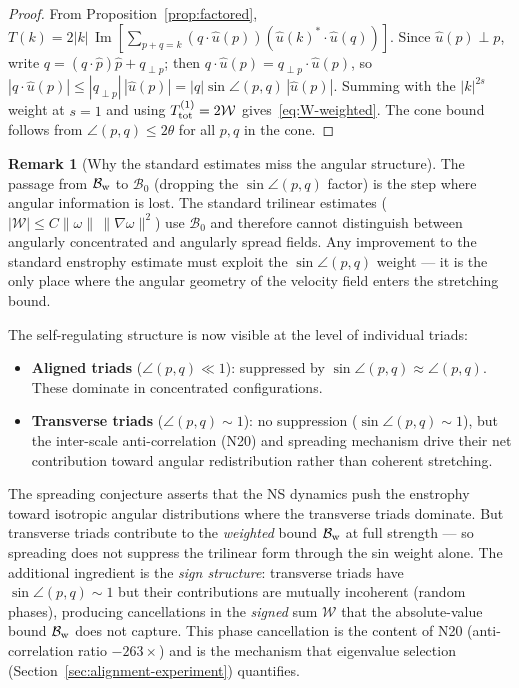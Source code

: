 \documentclass[11pt]{article}
\theoremstyle{definition}
\newtheorem{remark}[theorem]{Remark}
\newcommand{\cB}{\mathcal{B}}
\DeclareMathOperator{\im}{Im}
\begin{document}
\begin{proof}
From Proposition~\ref{prop:factored},
$T(k) = 2|k|\,\im[\sum_{p+q=k}
(q\cdot\hat u(p))(\hat u(k)^*\cdot\hat u(q))]$.
Since $\hat u(p)\perp p$, write
$q = (q\cdot\hat p)\hat p + q_{\perp p}$;
then $q\cdot\hat u(p) = q_{\perp p}\cdot\hat u(p)$,
so $|q\cdot\hat u(p)| \leq |q_{\perp p}|\,|\hat u(p)|
= |q|\sin\angle(p,q)\,|\hat u(p)|$.
Summing with the $|k|^{2s}$ weight at $s=1$ and
using $T_{\rm tot}^{(1)}=2\mathcal{W}$
gives~\eqref{eq:W-weighted}.
The cone bound follows from
$\angle(p,q)\leq 2\theta$ for all $p,q$ in the cone.
\end{proof}

\begin{remark}[Why the standard estimates miss
the angular structure]
\label{rem:standard-miss}
The passage from $\cB_{\rm w}$ to $\cB_0$ (dropping
the $\sin\angle(p,q)$ factor) is the step where
angular information is lost.  The standard trilinear
estimates
($|\mathcal{W}|\leq C\|\omega\|\,\|\nabla\omega\|^2$)
use $\cB_0$ and therefore cannot distinguish between
angularly concentrated and angularly spread fields.
Any improvement to the standard enstrophy estimate
must exploit the $\sin\angle(p,q)$ weight --- it is
the only place where the angular geometry of
the velocity field enters the stretching bound.

The self-regulating structure is now visible at the
level of individual triads:
\begin{itemize}[leftmargin=2em]
\item \textbf{Aligned triads} ($\angle(p,q)\ll 1$):
  suppressed by $\sin\angle(p,q)\approx\angle(p,q)$.
  These dominate in concentrated configurations.
\item \textbf{Transverse triads} ($\angle(p,q)\sim 1$):
  no suppression ($\sin\angle(p,q)\sim 1$), but the
  inter-scale anti-correlation (N20) and spreading
  mechanism drive their net contribution toward
  angular redistribution rather than coherent
  stretching.
\end{itemize}
The spreading conjecture asserts that the NS dynamics
push the enstrophy toward isotropic angular
distributions where the transverse triads dominate.
But transverse triads contribute to the
\emph{weighted} bound $\cB_{\rm w}$ at full strength
--- so spreading does not suppress the trilinear
form through the sin weight alone.  The additional
ingredient is the \emph{sign structure}: transverse
triads have $\sin\angle(p,q)\sim 1$ but their
contributions are mutually incoherent (random phases),
producing cancellations in the \emph{signed} sum
$\mathcal{W}$ that the absolute-value bound
$\cB_{\rm w}$ does not capture.
This phase cancellation is the content of N20
(anti-correlation ratio $-263\times$) and is the
mechanism that eigenvalue selection
(Section~\ref{sec:alignment-experiment}) quantifies.
\end{remark}
\end{document}
